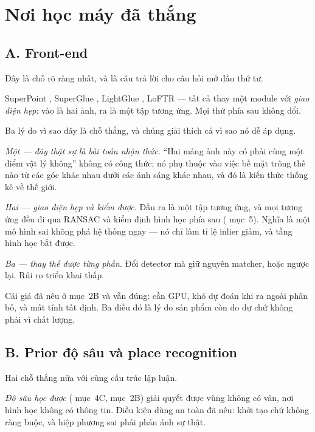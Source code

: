 \documentclass[../../vslam.tex]{subfiles}
\begin{document}
\section{Nơi học máy đã thắng}

\subsection{A. Front-end}

Đây là chỗ rõ ràng nhất, và là câu trả lời cho câu hỏi mở đầu thứ tư.

SuperPoint \cite{detone2018superpoint}, SuperGlue \cite{sarlin2020superglue}, LightGlue \cite{lindenberger2023lightglue}, LoFTR \cite{sun2021loftr} --- tất cả thay một module với \emph{giao diện hẹp}: vào là hai ảnh, ra là một tập tương ứng. Mọi thứ phía sau không đổi.

Ba lý do vì sao đây là chỗ thắng, và chúng giải thích cả vì sao nó dễ áp dụng.

\emph{Một --- đây thật sự là bài toán nhận thức.} ``Hai mảng ảnh này có phải cùng một điểm vật lý không'' không có công thức; nó phụ thuộc vào việc bề mặt trông thế nào từ các góc khác nhau dưới các ánh sáng khác nhau, và đó là kiến thức thống kê về thế giới.

\emph{Hai --- giao diện hẹp và kiểm được.} Đầu ra là một tập tương ứng, và mọi tương ứng đều đi qua RANSAC và kiểm định hình học phía sau ( mục~5). Nghĩa là một mô hình sai không phá hệ thống ngay --- nó chỉ làm tỉ lệ inlier giảm, và tầng hình học bắt được.

\emph{Ba --- thay thế được từng phần.} Đổi detector mà giữ nguyên matcher, hoặc ngược lại. Rủi ro triển khai thấp.

Cái giá đã nêu ở  mục~2B và vẫn đúng: cần GPU, khó dự đoán khi ra ngoài phân bố, và mất tính tất định. Ba điều đó là lý do sản phẩm còn do dự chứ không phải vì chất lượng.

\subsection{B. Prior độ sâu và place recognition}

Hai chỗ thắng nữa với cùng cấu trúc lập luận.

\emph{Độ sâu học được} ( mục~4C,  mục~2B) giải quyết được vùng không có vân, nơi hình học không có thông tin. Điều kiện dùng an toàn đã nêu: khởi tạo chứ không ràng buộc, và hiệp phương sai phải phản ánh sự thật.
\end{document}
